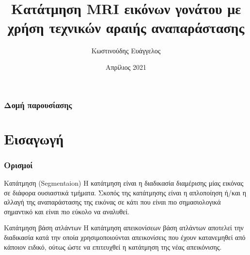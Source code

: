 \documentclass{beamer}
\title[Short title] {Κατάτμηση MRI εικόνων γονάτου με χρήση τεχνικών αραιής
αναπαράστασης}
\institute 
{
    Αριστοτέλειο Πανεπιστήμιο Θεσσαλονίκης \\
    Τμήμα Ηλεκτρολόγων Μηχανικών και Μηχανικών Υπολογιστών \\
    Τομέας Ηλεκτρονικής και Υπολογιστών
}
\author {Κωστινούδης Ευάγγελος}
\date{Απρίλιος 2021}
\begin{document}
\begin{frame}

\maketitle


\end{frame}

\begin{frame}
\frametitle{Δομή παρουσίασης}
\tableofcontents[hideallsubsections]
\end{frame}

\section{Εισαγωγή}

\begin{frame}
\frametitle{Ορισμοί}
\begin{block}{Κατάτμηση (Segmentaion)}
Η κατάτμηση είναι η διαδικασία διαμέρισης μίας εικόνας σε διάφορα ουσιαστικά
τμήματα. Σκοπός της κατάτμησης είναι η απλοποίηση ή/και η αλλαγή της
αναπαράστασης της εικόνας σε κάτι που είναι πιο σημασιολογικά σημαντικό και
είναι πιο εύκολο να αναλυθεί.
\end{block} \pause

\begin{block}{Κατάτμηση βάση ατλάντων}
Η κατάτμηση απεικονίσεων βάση ατλάντων αποτελεί την διαδικασία κατά την οποία
χρησιμοποιούνται απεικονίσεις που έχουν κατανεμηθεί από κάποιον ειδικό, ούτως
ώστε να επιτευχθεί η κατάτμηση της νέας απεικόνισης.
\end{block} 
\end{frame}
\end{document}
